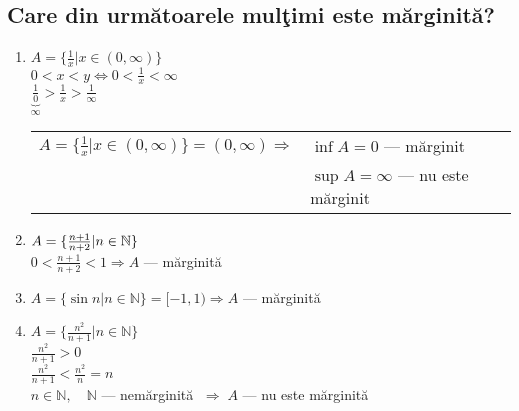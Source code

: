 \documentclass[a4paper, 12pt, notitlepage]{book}
\begin{document}
    \subsection{Care din urm\u{a}toarele mul\c{t}imi este m\u{a}rginit\u{a}?}
    \begin{enumerate}[\quad a.]
      \item $A = \{ \frac{1}{x} \vert x \in (0,\infty) \}$\\[5pt]
            $0 < x < y \Leftrightarrow 0 < \frac{1}{x} < \infty$\\[5pt]
            $\underbrace{\frac{1}{0}}_{\infty} > \frac{1}{x} > \frac{1}{\infty} $\\[5pt]
            \begin{tabular}{ll}
              $A = \{ \frac{1}{x} \vert x \in (0,\infty) \} = (0, \infty) \Rightarrow$ & $\inf A = 0$ --- m\u{a}rginit\\
                                                                                       & $\sup A = \infty$ --- nu este m\u{a}rginit
            \end{tabular}
      \item $A = \{ \frac{n+1}{n+2} \arrowvert n \in \mathbb{N} \}$\\[5pt]
            $0 < \frac{n+1}{n+2} < 1 \Rightarrow A$ --- m\u{a}rginit\u{a}
      \item $A = \{ \sin n | n \in \mathbb{N} \} = [-1, 1) \Rightarrow A$ --- m\u{a}rginit\u{a}
      \item $A = \{ \frac{n^{2}}{n+1} | n \in \mathbb{N} \}$\\[5pt]
            $\frac{n^{2}}{n+1} > 0$\\[5pt]
            $\frac{n^{2}}{n+1} < \frac{n^{2}}{n} = n$\\[5pt]
            $n \in \mathbb{N},\quad \mathbb{N}$ --- nem\u{a}rginit\u{a} $\; \Rightarrow \; A$ --- nu este m\u{a}rginit\u{a}

    \end{enumerate}
\end{document}
